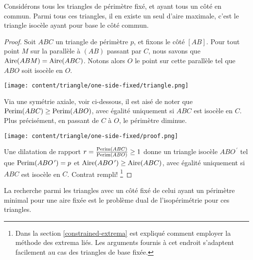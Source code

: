 \begin{fact} \label{tri-one-side-fixed}
	Considérons tous les triangles de périmètre fixé, et ayant tous un côté en commun.
	Parmi tous ces triangles, il en existe un seul d'aire maximale, c'est le triangle isocèle ayant pour base le côté commun.
\end{fact}


\begin{proof}
	Soit $ABC$ un triangle de périmètre $p$, et fixons le côté $[AB]$. 
	Pour tout point $M$ sur la parallèle à $(AB)$ passant par $C$, nous savons que $\mathrm{Aire}(ABM) = \mathrm{Aire}(ABC)$. Notons alors $O$ le point sur cette parallèle tel que $ABO$ soit isocèle en $O$.

	\begin{center}
		\texttt{[image: content/triangle/one-side-fixed/triangle.png]}
	\end{center}

	
	Via une symétrie axiale, voir ci-dessous, il est aisé de noter que $\mathrm{Perim}(ABC) \geq \mathrm{Perim}(ABO)$, avec égalité uniquement si $ABC$ est isocèle en $C$.
	Plus précisément, en passant de $C$ à $O$, le périmètre diminue.
	
	\begin{center}
		\texttt{[image: content/triangle/one-side-fixed/proof.png]}
	\end{center}
	
	Une dilatation  de rapport $r = \frac{\mathrm{Perim}(ABC)}{\mathrm{Perim}(ABO)} \geq 1$ donne un triangle isocèle $ABO^{\,\prime}$ tel que 
	$\mathrm{Perim}(ABO^{\,\prime}) = p$
	et 
	$\mathrm{Aire}(ABO^{\,\prime}) \geq \mathrm{Aire}(ABC)$, avec égalité uniquement si $ABC$ est isocèle en $C$. 
	Contrat rempli!%
	\footnote{
		Dans la section \ref{constrained-extrema} est expliqué comment employer la méthode des extrema liés. 
		Les arguments fournis à cet endroit s'adaptent facilement au cas des triangles de base fixée.
	}
\end{proof}




\begin{remark}
	La recherche parmi les triangles avec un côté fixé de celui ayant un périmètre minimal pour une aire fixée est le problème dual de l'isopérimétrie pour ces triangles.
\end{remark}
